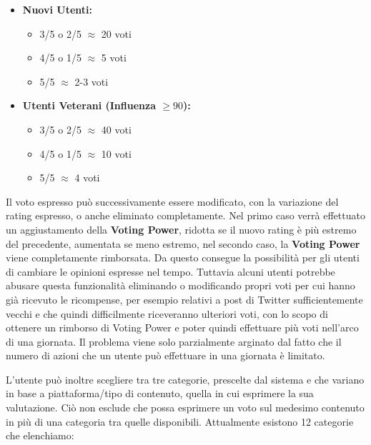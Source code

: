 \begin{itemize}
    \item \textbf{Nuovi Utenti:}
    \begin{itemize}
        \item 3/5 o 2/5 $\approx$ 20 voti
    \end{itemize}
    \begin{itemize}
        \item 4/5 o 1/5 $\approx$ 5 voti
    \end{itemize}
    \begin{itemize}
        \item 5/5 $\approx$ 2-3 voti
    \end{itemize}
    \item \textbf{Utenti Veterani (Influenza $\geq 90$):}
    \begin{itemize}
        \item 3/5 o 2/5 $\approx$ 40 voti
    \end{itemize}
    \begin{itemize}
        \item 4/5 o 1/5 $\approx$ 10 voti
    \end{itemize}
    \begin{itemize}
        \item 5/5 $\approx$ 4 voti
    \end{itemize}
\end{itemize}

Il voto espresso può successivamente essere modificato, con la variazione del rating espresso, o anche eliminato completamente. Nel primo caso verrà effettuato un aggiustamento della \textbf{Voting Power}, ridotta se il nuovo rating è più estremo del precedente, aumentata se meno estremo, nel secondo caso, la \textbf{Voting Power} viene completamente rimborsata. Da questo consegue la possibilità per gli utenti di cambiare le opinioni espresse nel tempo. Tuttavia alcuni utenti potrebbe abusare questa funzionalità eliminando o modificando propri voti per cui hanno già ricevuto le ricompense, per esempio relativi a post di Twitter sufficientemente vecchi e che quindi difficilmente riceveranno ulteriori voti, con lo scopo di ottenere un rimborso di Voting Power e poter quindi effettuare più voti nell'arco di una giornata. Il problema viene solo parzialmente arginato dal fatto che il numero di azioni che un utente può effettuare in una giornata è limitato. 

L'utente può inoltre scegliere tra tre categorie, prescelte dal sistema e che variano in base a piattaforma/tipo di contenuto, quella in cui esprimere la sua valutazione. Ciò non esclude che possa esprimere un voto sul medesimo contenuto in più di una categoria tra quelle disponibili. Attualmente esistono 12 categorie che elenchiamo:

